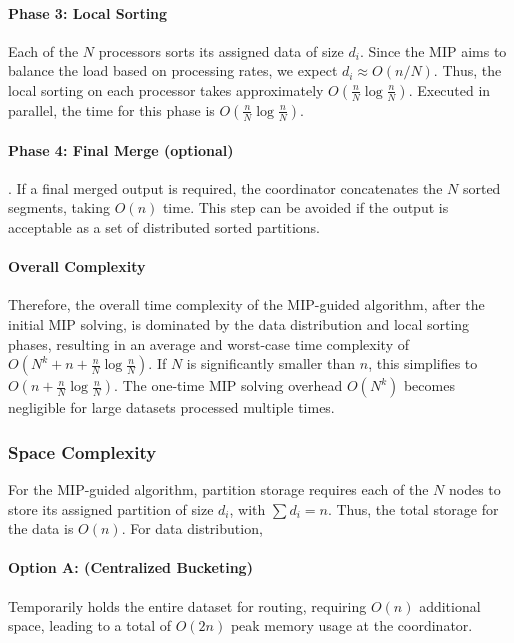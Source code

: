 \documentclass[]{interact}
\theoremstyle{plain}
\theoremstyle{definition}
\theoremstyle{remark}
\begin{document}
\paragraph{Phase 3: Local Sorting} Each of the $N$ processors sorts its assigned data of size $d_i$. Since the MIP aims to balance the load based on processing rates, we expect $d_i \approx O(n/N)$. Thus, the local sorting on each processor takes approximately $O\left(\frac{n}{N} \log \frac{n}{N}\right)$. Executed in parallel, the time for this phase is $O\left(\frac{n}{N} \log \frac{n}{N}\right)$.

\paragraph{Phase 4: Final Merge (optional)}. If a final merged output is required, the coordinator concatenates the $N$ sorted segments, taking $O(n)$ time. This step can be avoided if the output is acceptable as a set of distributed sorted partitions.

\paragraph{Overall Complexity} Therefore, the overall time complexity of the MIP-guided algorithm, after the initial MIP solving, is dominated by the data distribution and local sorting phases, resulting in an average and worst-case time complexity of $O(N^k + n + \frac{n}{N} \log \frac{n}{N})$. If $N$ is significantly smaller than $n$, this simplifies to $O(n + \frac{n}{N} \log \frac{n}{N})$. The one-time MIP solving overhead $O(N^k)$ becomes negligible for large datasets processed multiple times.

\subsubsection{Space Complexity}

For the MIP-guided algorithm, partition storage requires each of the $N$ nodes to store its assigned partition of size $d_i$, with $\sum d_i = n$. Thus, the total storage for the data is $O(n)$. For data distribution, 

\paragraph{Option A: (Centralized Bucketing)} Temporarily holds the entire dataset for routing, requiring $O(n)$ additional space, leading to a total of $O(2n)$ peak memory usage at the coordinator. 
\end{document}
